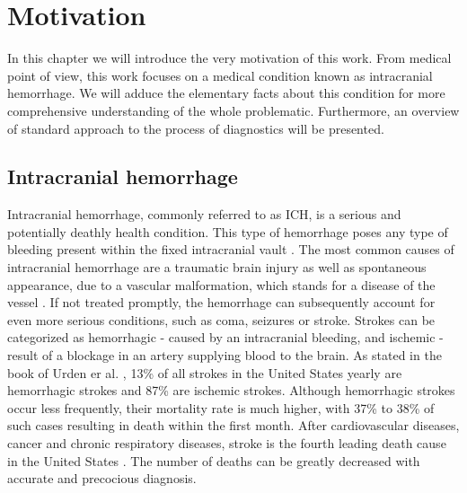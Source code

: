 \chapter{Motivation}

In this chapter we will introduce the very motivation of this work. From medical point of view, this work focuses on a medical condition known as intracranial hemorrhage. We will adduce the elementary facts about this condition for more comprehensive understanding of the whole problematic. Furthermore, an overview of standard approach to the process of diagnostics will be presented.

\section{Intracranial hemorrhage}
Intracranial hemorrhage, commonly referred to as ICH, is a serious and potentially deathly health condition. This type of hemorrhage poses any type of bleeding present within the fixed intracranial vault \cite{intracranial1}. The most common causes of intracranial hemorrhage are a traumatic brain injury as well as spontaneous appearance, due to a vascular malformation, which stands for a disease of the vessel \cite{intracranial2}. If not treated promptly, the hemorrhage can subsequently account for even more serious conditions, such as coma, seizures or stroke. \cite{intracranial2} Strokes can be categorized as hemorrhagic - caused by an intracranial bleeding, and ischemic - result of a blockage in an artery supplying blood to the brain. As stated in the book of Urden er al. \cite{ICHbookstats}, 13\% of all strokes in the United States yearly are hemorrhagic strokes and 87\% are ischemic strokes. Although hemorrhagic strokes occur less frequently, their mortality rate is much higher, with 37\% to 38\% of such cases resulting in death within the first month. After cardiovascular diseases, cancer and chronic respiratory diseases, stroke is the fourth leading death cause in the United States \cite{ICHbookstats}. The number of deaths can be greatly decreased with accurate and precocious diagnosis. 

